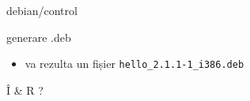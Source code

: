 \documentclass{beamer}
\begin{document}
\begin{frame}{debian/control}
  \begin{beamerboxesrounded}[lower=block body,shadow=true]{}
    \small 
  \end{beamerboxesrounded}
\end{frame}

\begin{frame}{generare .deb}
  \begin{itemize}
  \begin{beamerboxesrounded}[lower=block body,shadow=true]{}
    debuild
  \end{beamerboxesrounded}
  \item va rezulta un fișier \texttt{hello\_2.1.1-1\_i386.deb}
  \end{itemize}
\end{frame}

\begin{frame}{Î \& R}
  ?
\end{frame}
\end{document}
